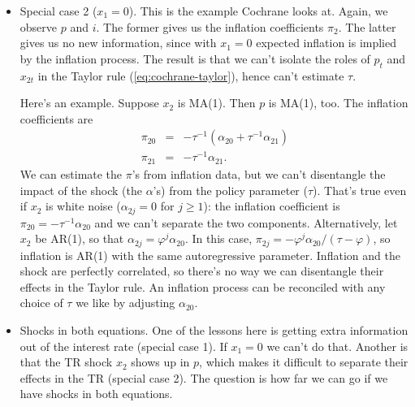 \documentclass[11pt]{article}
\begin{document}
{\begin{itemize}
\item Special case 2 ($x_1=0$).
This is the example Cochrane looks at.
Again, we observe $p$ and $i$.
The former gives us the inflation coefficients $\pi_2$.
The latter gives us no new information,
since with $x_1=0$
expected inflation is implied by the inflation process.
The result is that we can't isolate the roles of $p_t$ and $x_{2t}$
in the Taylor rule (\ref{eq:cochrane-taylor}), hence can't estimate $\tau$.

Here's an example.
Suppose $x_2$ is MA(1).  Then $p$ is MA(1), too.
The inflation coefficients are
\begin{eqnarray*}
    \pi_{20} &=& - \tau^{-1} (\alpha_{20} + \tau^{-1} \alpha_{21} ) \\
    \pi_{21} &=& - \tau^{-1} \alpha_{21} .
\end{eqnarray*}
We can estimate the $\pi$'s from inflation data,
but we can't disentangle the impact
of the shock (the $\alpha$'s) from the policy parameter ($\tau$).
That's true even if $x_2$ is white noise ($\alpha_{2j} = 0$ for $j \geq 1$):
the inflation coefficient is $\pi_{20} = - \tau^{-1} \alpha_{20}$ and we
can't separate the two components.
Alternatively, let $x_2$ be AR(1), so that
$ \alpha_{2j} = \varphi^j \alpha_{20} $.
In this case, $ \pi_{2j} = - \varphi^j \alpha_{20} /(\tau-\varphi)$,
so inflation is AR(1) with the same autoregressive parameter.
Inflation and the shock are perfectly correlated, so
there's no way we can disentangle their effects in the Taylor rule.
An inflation process can be reconciled with any choice of $\tau$ we
like by adjusting $\alpha_{20}$.



\item Shocks in both equations.
One of the lessons here is getting extra information out of the
interest rate (special case 1).
If $x_1 = 0$ we can't do that.
Another is that the TR shock $x_2$ shows up in $p$,
which makes it difficult to separate their effects in the TR
(special case 2).
The question is how far we can go if we have shocks
in both equations.


\end{itemize}}
\end{document}
